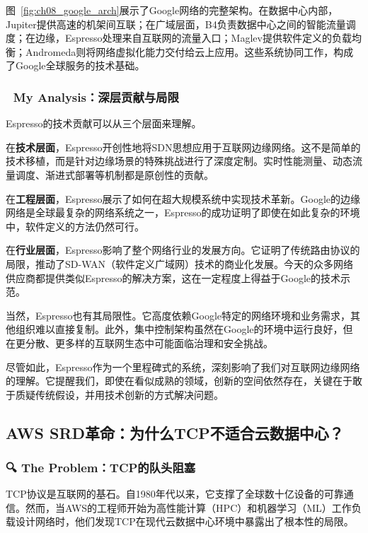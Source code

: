 图~\ref{fig:ch08_google_arch}展示了Google网络的完整架构。在数据中心内部，Jupiter提供高速的机架间互联；在广域层面，B4负责数据中心之间的智能流量调度；在边缘，Espresso处理来自互联网的流量入口；Maglev提供软件定义的负载均衡；Andromeda则将网络虚拟化能力交付给云上应用。这些系统协同工作，构成了Google全球服务的技术基础。

\subsubsection{🧠 My Analysis：深层贡献与局限}

Espresso的技术贡献可以从三个层面来理解。

在\textbf{技术层面}，Espresso开创性地将SDN思想应用于互联网边缘网络。这不是简单的技术移植，而是针对边缘场景的特殊挑战进行了深度定制。实时性能测量、动态流量调度、渐进式部署等机制都是原创性的贡献。

在\textbf{工程层面}，Espresso展示了如何在超大规模系统中实现技术革新。Google的边缘网络是全球最复杂的网络系统之一，Espresso的成功证明了即使在如此复杂的环境中，软件定义的方法仍然可行。

在\textbf{行业层面}，Espresso影响了整个网络行业的发展方向。它证明了传统路由协议的局限，推动了SD-WAN（软件定义广域网）技术的商业化发展。今天的众多网络供应商都提供类似Espresso的解决方案，这在一定程度上得益于Google的技术示范。

当然，Espresso也有其局限性。它高度依赖Google特定的网络环境和业务需求，其他组织难以直接复制。此外，集中控制架构虽然在Google的环境中运行良好，但在更分散、更多样的互联网生态中可能面临治理和安全挑战。

尽管如此，Espresso作为一个里程碑式的系统，深刻影响了我们对互联网边缘网络的理解。它提醒我们，即使在看似成熟的领域，创新的空间依然存在，关键在于敢于质疑传统假设，并用技术创新的方式解决问题。

\subsection{AWS SRD革命：为什么TCP不适合云数据中心？}

\subsubsection{🔍 The Problem：TCP的队头阻塞}

TCP协议是互联网的基石。自1980年代以来，它支撑了全球数十亿设备的可靠通信。然而，当AWS的工程师开始为高性能计算（HPC）和机器学习（ML）工作负载设计网络时，他们发现TCP在现代云数据中心环境中暴露出了根本性的局限。

